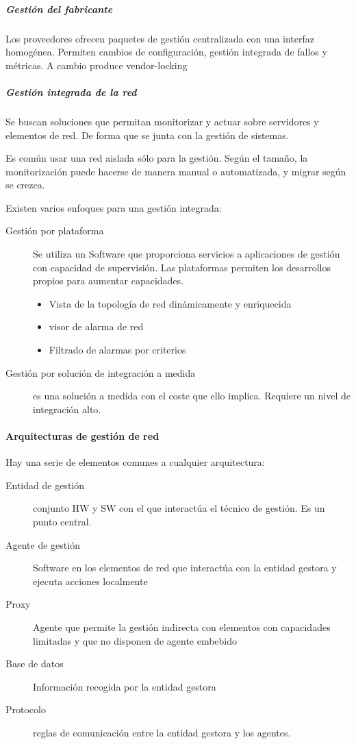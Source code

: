             \subparagraph{Gestión del fabricante} %
                Los proveedores ofrecen paquetes de gestión centralizada con una interfaz homogénea. Permiten cambios de configuración, gestión integrada de fallos y métricas. A cambio produce vendor-locking

            \subparagraph{Gestión integrada de la red} %
                Se buscan soluciones que permitan monitorizar y actuar sobre servidores y elementos de red. De forma que se junta con la gestión de sistemas.

                Es común usar una red aislada sólo para la gestión. Según el tamaño, la monitorización puede hacerse de manera manual o automatizada, y migrar según se crezca.

                Existen varios enfoques para una gestión integrada:
                \begin{description}
                    \item[Gestión por plataforma] Se utiliza un Software que proporciona servicios a aplicaciones de gestión con capacidad de supervisión. Las plataformas permiten los desarrollos propios para aumentar capacidades. \begin{itemize}
                        \item Vista de la topología de red dinámicamente y enriquecida
                        \item visor de alarma de red
                        \item Filtrado de alarmas por criterios
                    \end{itemize}
                    \item[Gestión por solución de integración a medida] es una solución a medida con el coste que ello implica. Requiere un nivel de integración alto.
                \end{description}

        \paragraph{Arquitecturas de gestión de red} %
            Hay una serie de elementos comunes a cualquier arquitectura:
            \begin{description}
                \item[Entidad de gestión] conjunto HW y SW con el que interactúa el técnico de gestión. Es un punto central.
                \item[Agente de gestión]Software en los elementos de red que interactúa con la entidad gestora y ejecuta acciones localmente
                \item[Proxy] Agente que permite la gestión indirecta con elementos con capacidades limitadas y que no disponen de agente embebido
                \item[Base de datos] Información recogida por la entidad gestora
                \item[Protocolo] reglas de comunicación entre la entidad gestora y los agentes. 
            \end{description}


